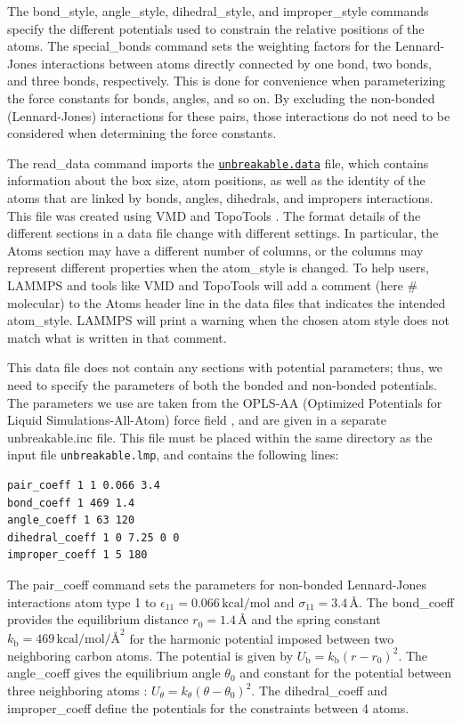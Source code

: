 \documentclass[9pt,tutorial]{livecoms}
\newcommand{\lmpcmd}[1]{\hspace{0pt}\colorbox{listing}{\textcolor{command}{\small{#1}}}\hspace{0pt}} %
\newcommand{\flecmd}[1]{\textcolor{command}{\texttt{#1}}} %
\newcommand{\dwlcmd}[1]{\textcolor{download}{\texttt{#1}}} %
\newcommand{\filepath}{https://raw.githubusercontent.com/lammpstutorials/lammpstutorials-article/main/files/}
\begin{document}
The \lmpcmd{bond\_style}, \lmpcmd{angle\_style},
\lmpcmd{dihedral\_style}, and \lmpcmd{improper\_style} commands specify
the different potentials used to constrain the relative positions of the
atoms.  The \lmpcmd{special\_bonds} command sets the weighting factors
for the Lennard-Jones interactions between atoms directly connected by
one bond, two bonds, and three bonds, respectively.  This is done for
convenience when parameterizing the force constants for bonds, angles, and
so on.  By excluding the non-bonded (Lennard-Jones) interactions for
these pairs, those interactions do not need to be considered when determining
the force constants.

The \lmpcmd{read\_data} command imports the
\href{\filepath tutorial2/unbreakable.data}{\dwlcmd{unbreakable.data}}
file, which contains information about the box
size, atom positions, as well as the identity of the atoms that are
linked by \lmpcmd{bonds}, \lmpcmd{angles}, \lmpcmd{dihedrals}, and
\lmpcmd{impropers} interactions.  This file was created using VMD and TopoTools
\cite{kohlmeyer2017topotools}.  The format details of the
different sections in a data file change with different settings.  In
particular, the \lmpcmd{Atoms} section may have a different number of
columns, or the columns may represent different properties when the
\lmpcmd{atom\_style} is changed.  To help users, LAMMPS and tools like
VMD and TopoTools will add a comment (here \lmpcmd{\# molecular}) to the
\lmpcmd{Atoms} header line in the data files that indicates the intended
\lmpcmd{atom\_style}.  LAMMPS will print a warning when the chosen atom
style does not match what is written in that comment.

This data file does not contain any sections with potential parameters; thus,
we need to specify the parameters of both the bonded and
non-bonded potentials.  The parameters we use are taken
from the OPLS-AA (Optimized Potentials for Liquid Simulations-All-Atom)
force field \cite{jorgensenDevelopmentTestingOPLS1996}, and are given
in a separate \lmpcmd{unbreakable.inc} file.  This file must be placed within the same
directory as the input file \flecmd{unbreakable.lmp}, and contains the following lines:
\begin{lstlisting}
pair_coeff 1 1 0.066 3.4
bond_coeff 1 469 1.4
angle_coeff 1 63 120
dihedral_coeff 1 0 7.25 0 0
improper_coeff 1 5 180
\end{lstlisting}
The \lmpcmd{pair\_coeff} command sets the parameters for non-bonded
Lennard-Jones interactions atom type 1 to
$\epsilon_{11} = 0.066 \, \text{kcal/mol}$ and
$\sigma_{11} = 3.4 \, \text{\AA{}}$.  The \lmpcmd{bond\_coeff} provides
the equilibrium distance $r_0= 1.4 \, \text{\AA{}}$ and the
spring constant $k_\text{b} = 469 \, \text{kcal/mol/\AA{}}^2$ for the
harmonic potential imposed between two neighboring carbon atoms.  The potential
is given by $U_\text{b} = k_\text{b} ( r - r_0)^2$.  The
\lmpcmd{angle\_coeff} gives the equilibrium angle $\theta_0$ and
constant for the potential between three neighboring atoms :
$U_\theta = k_\theta ( \theta - \theta_0)^2$.  The
\lmpcmd{dihedral\_coeff} and \lmpcmd{improper\_coeff} define the potentials
for the constraints between 4 atoms.
\end{document}
